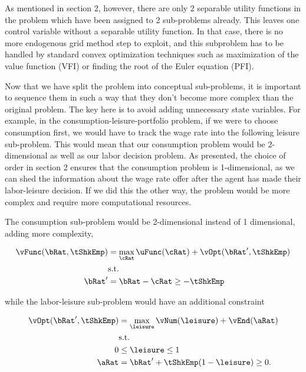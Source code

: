 \documentclass[\econtexRoot/SequentialEGM]{subfiles}
\begin{document}
As mentioned in section 2, however, there are only 2 separable utility functions in the problem which have been assigned to 2 sub-problems already. This leaves one control variable without a separable utility function. In that case, there is no more endogenous grid method step to exploit, and this subproblem has to be handled by standard convex optimization techniques such as maximization of the value function (VFI) or finding the root of the Euler equation (PFI).

Now that we have split the problem into conceptual sub-problems, it is important to sequence them in such a way that they don't become more complex than the original problem. The key here is to avoid adding unnecessary state variables. For example, in the consumption-leisure-portfolio problem, if we were to choose consumption first, we would have to track the wage rate into the following leisure sub-problem. This would mean that our consumption problem would be 2-dimensional as well as our labor decision problem. As presented, the choice of order in section 2 ensures that the consumption problem is 1-dimensional, as we can shed the information about the wage rate offer after the agent has made their labor-leisure decision. If we did this the other way, the problem would be more complex and require more computational resources.

The consumption sub-problem would be 2-dimensional instead of 1 dimensional, adding more complexity,

\begin{equation}
    \begin{split}
        \vFunc(\bRat, \tShkEmp) & = \max_{\cRat} \uFunc(\cRat) + \vOpt(\bRat', \tShkEmp) \\
        & \text{s.t.}\\
        \bRat' & = \bRat - \cRat \ge - \tShkEmp
    \end{split}
\end{equation}

while the labor-leisure sub-problem would have an additional constraint

\begin{equation}
    \begin{split}
        \vOpt(\bRat', \tShkEmp) & = \max_{\leisure} \vNum(\leisure) + \vEnd(\aRat) \\
        & \text{s.t.} \\
        0 & \le \leisure \le 1 \\
        \aRat & = \bRat' + \tShkEmp(1 - \leisure) \ge 0.
    \end{split}
\end{equation}
\end{document}

